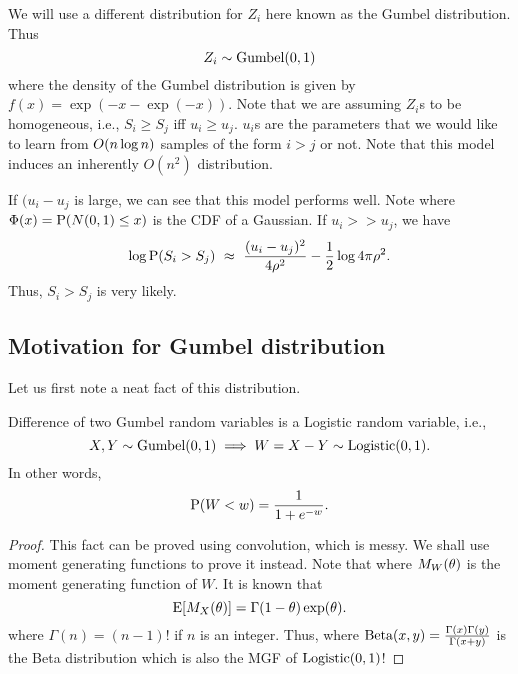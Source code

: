 \documentclass[letterpaper, 11pt, reqno]{amsart}
\begin{document}
We will use a different distribution for $Z_i$ here known as the Gumbel distribution. Thus
$$Z_i \sim \gumbel(0,1)$$
where the density of the Gumbel distribution is given by $f(x) = \exp(-x -\exp(-x))$. Note that we are assuming $Z_i$s to be homogeneous, i.e., $S_i \geq S_j$ iff $u_i \geq u_j$. $u_i$s are the parameters that we would like to learn from $\bigo(n \log n)$ samples of the form $i > j$ or not. Note that this model induces an inherently $O(n^2)$ distribution.

\begin{remark}
If $(u_i - u_j$ is large, we can see that this model performs well. Note
where $\Phi(x) = \P(N(0,1) \leq x)$ is the CDF of a Gaussian. If $u_i >> u_j$, we have
$$
\log \P(S_i > S_j)\ \approx\ \f{(u_i -u_j)^2}{4 \rho^2} - \f{1}{2} \log 4 \pi \rho^2.
$$
Thus, $S_i > S_j$ is very likely.
\end{remark}

\subsection{Motivation for Gumbel distribution}
Let us first note a neat fact of this distribution.
\begin{lemma}
\label{lem:gumbel_mgf}
Difference of two Gumbel random variables is a Logistic random variable, i.e.,
$$
X, Y \sim \gumbel(0,1) \implies W = X-Y \sim \logistic(0,1).
$$
In other words,
$$
\P(W < w) = \f{1}{1+e^{-w}}.
$$
\end{lemma}
\begin{proof}
This fact can be proved using convolution, which is messy. We shall use moment generating functions to prove it instead. Note that
where $M_W(\th)$ is the moment generating function of $W$. It is known that
$$
\E[M_X(\th)] = \Gamma(1-\th) \exp(\th).
$$
where $\Gamma(n) = (n-1)!$ if $n$ is an integer.
Thus,
where $\trm{Beta}(x,y) = \f{\Gamma(x) \Gamma(y)}{\Gamma(x+y)}$ is the Beta distribution which is also the MGF of $\logistic(0,1)$!
\end{proof}
\end{document}
